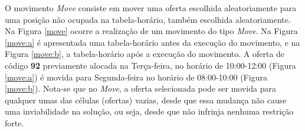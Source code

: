 O movimento \textit{Move} consiste em mover uma oferta escolhida aleatoriamente para uma posição não ocupada na tabela-horário, também escolhida aleatoriamente. Na Figura \ref{move} ocorre a realização de um movimento do tipo \textit{Move}. Na Figura \ref{move:a} é apresentada uma tabela-horário antes da execução do movimento, e na Figura \ref{move:b}, a tabela-horário após a execução do movimento. A oferta de código \textbf{92} previamente alocada na Terça-feira, no horário de 10:00-12:00 (Figura \ref{move:a}) é movida para Segunda-feira no horário de 08:00-10:00 (Figura \ref{move:b}). Nota-se que no \textit{Move}, a oferta selecionada pode ser movida para qualquer umas das células (ofertas) vazias, desde que essa mudança não cause uma inviabilidade na solução, ou seja, desde que não infrinja nenhuma restrição forte.

